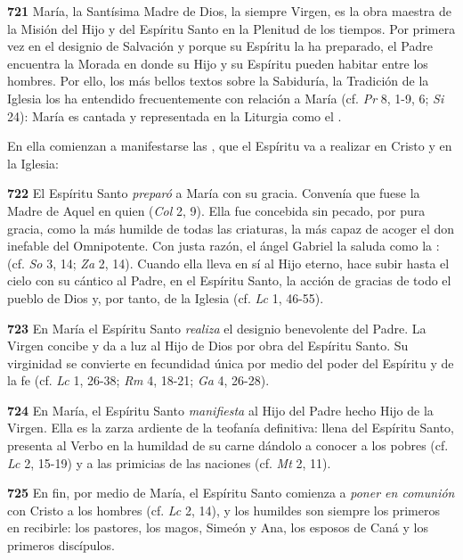 \textbf{}

\textbf{721} María, la Santísima Madre de Dios, la siempre Virgen, es la obra maestra de la Misión del Hijo y del Espíritu Santo en la Plenitud de los tiempos. Por primera vez en el designio de Salvación y porque su Espíritu la ha preparado, el Padre encuentra la Morada en donde su Hijo y su Espíritu pueden habitar entre los hombres. Por ello, los más bellos textos sobre la Sabiduría, la Tradición de la Iglesia los ha entendido frecuentemente con relación a María (cf. \emph{Pr} 8, 1-9, 6; \emph{Si} 24): María es cantada y representada en la Liturgia como el .

En ella comienzan a manifestarse las , que el Espíritu va a realizar en Cristo y en la Iglesia:

\textbf{722} El Espíritu Santo \emph{preparó} a María con su gracia. Convenía que fuese  la Madre de Aquel en quien  (\emph{Col} 2, 9). Ella fue concebida sin pecado, por pura gracia, como la más humilde de todas las criaturas, la más capaz de acoger el don inefable del Omnipotente. Con justa razón, el ángel Gabriel la saluda como la :  (cf. \emph{So} 3, 14; \emph{Za} 2, 14). Cuando ella lleva en sí al Hijo eterno, hace subir hasta el cielo con su cántico al Padre, en el Espíritu Santo, la acción de gracias de todo el pueblo de Dios y, por tanto, de la Iglesia (cf. \emph{Lc} 1, 46-55).

\textbf{723} En María el Espíritu Santo \emph{realiza} el designio benevolente del Padre. La Virgen concibe y da a luz al Hijo de Dios por obra del Espíritu Santo. Su virginidad se convierte en fecundidad única por medio del poder del Espíritu y de la fe (cf. \emph{Lc} 1, 26-38; \emph{Rm} 4, 18-21; \emph{Ga} 4, 26-28).

\textbf{724} En María, el Espíritu Santo \emph{manifiesta} al Hijo del Padre hecho Hijo de la Virgen. Ella es la zarza ardiente de la teofanía definitiva: llena del Espíritu Santo, presenta al Verbo en la humildad de su carne dándolo a conocer a los pobres (cf. \emph{Lc} 2, 15-19) y a las primicias de las naciones (cf. \emph{Mt} 2, 11).

\textbf{725} En fin, por medio de María, el Espíritu Santo comienza a \emph{poner en comunión} con Cristo a los hombres  (cf. \emph{Lc} 2, 14), y los humildes son siempre los primeros en recibirle: los pastores, los magos, Simeón y Ana, los esposos de Caná y los primeros discípulos.

